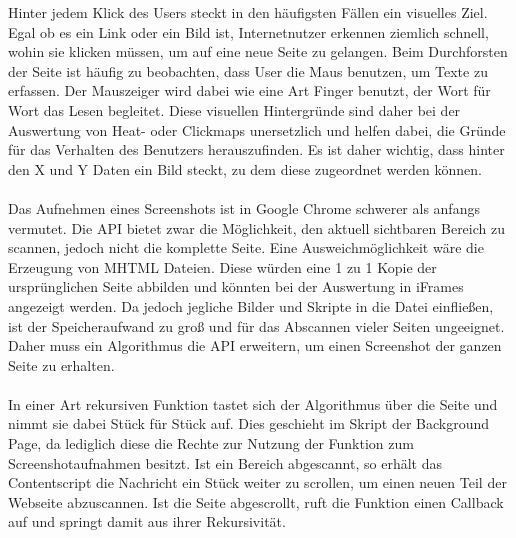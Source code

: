 Hinter jedem Klick des Users steckt in den häufigsten Fällen ein visuelles Ziel. Egal ob es ein Link oder ein Bild ist, Internetnutzer erkennen ziemlich schnell, wohin sie klicken müssen, um auf eine neue Seite zu gelangen. Beim Durchforsten der Seite ist häufig zu beobachten, dass User die Maus benutzen, um Texte zu erfassen. Der Mauszeiger wird dabei wie eine Art Finger benutzt, der Wort für Wort das Lesen begleitet. Diese visuellen Hintergründe sind daher bei der Auswertung von Heat- oder Clickmaps unersetzlich und helfen dabei, die Gründe für das Verhalten des Benutzers herauszufinden. Es ist daher wichtig, dass hinter den X und Y Daten ein Bild steckt, zu dem diese zugeordnet werden können.\\
\\
Das Aufnehmen eines Screenshots ist in Google Chrome schwerer als anfangs vermutet. Die API bietet zwar die Möglichkeit, den aktuell sichtbaren Bereich zu scannen, jedoch nicht die komplette Seite. Eine Ausweichmöglichkeit wäre die Erzeugung von \Gls{MHTML} Dateien. Diese würden eine 1 zu 1 Kopie der ursprünglichen Seite abbilden und könnten bei der Auswertung in iFrames angezeigt werden. Da jedoch jegliche Bilder und Skripte in die Datei einfließen, ist der Speicheraufwand zu groß und für das Abscannen vieler Seiten ungeeignet. Daher muss ein Algorithmus die API erweitern, um einen Screenshot der ganzen Seite zu erhalten.\\
\\
In einer Art rekursiven Funktion tastet sich der Algorithmus über die Seite und nimmt sie dabei Stück für Stück auf. Dies geschieht im Skript der Background Page, da lediglich diese die Rechte zur Nutzung der Funktion zum Screenshotaufnahmen besitzt. Ist ein Bereich abgescannt, so erhält das Contentscript die Nachricht ein Stück weiter zu scrollen, um einen neuen Teil der Webseite abzuscannen. Ist die Seite abgescrollt, ruft die Funktion einen Callback auf und springt damit aus ihrer Rekursivität.
\\

